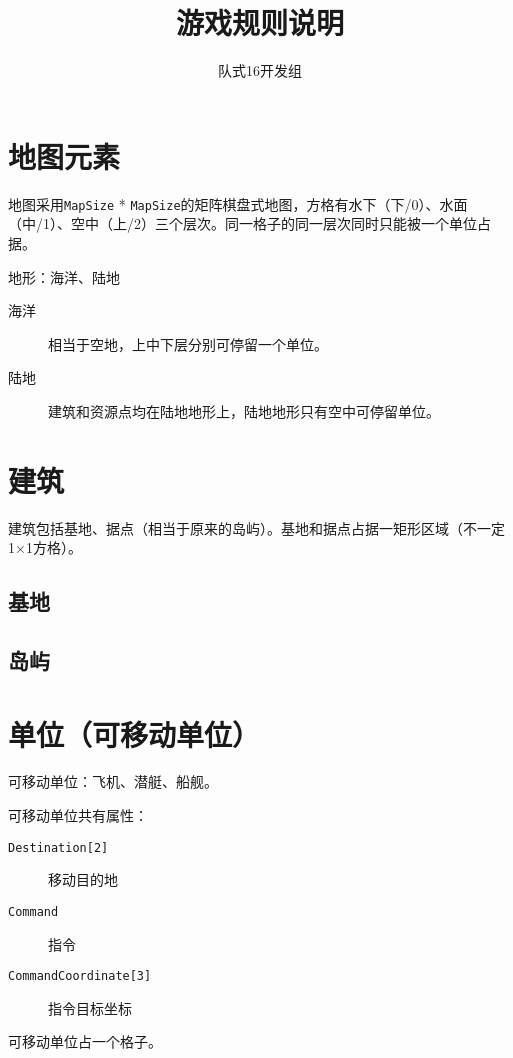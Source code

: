 \documentclass[11pt,a4paper]{article}
\title{游戏规则说明}
\author{队式16开发组}
\begin{document}
  \maketitle

  \section{地图元素}
    地图采用\texttt{MapSize} * \texttt{MapSize}的矩阵棋盘式地图，方格有水下（下/0）、水面（中/1）、空中（上/2）三个层次。同一格子的同一层次同时只能被一个单位占据。

    地形：海洋、陆地

    \begin{description}
      \item[海洋] 相当于空地，上中下层分别可停留一个单位。
      \item[陆地] 建筑和资源点均在陆地地形上，陆地地形只有空中可停留单位。
    \end{description}


  \section{建筑}
    建筑包括基地、据点（相当于原来的岛屿）。基地和据点占据一矩形区域（不一定1×1方格）。

    \subsection{基地}
    \subsection{岛屿}



  \section{单位（可移动单位）}
    可移动单位：飞机、潜艇、船舰。

    可移动单位共有属性：

    \begin{description}
      \item[\texttt{Destination[2]}] 移动目的地
      \item[\texttt{Command}] 指令
      \item[\texttt{CommandCoordinate[3]}] 指令目标坐标
    \end{description}

    可移动单位占一个格子。
\end{document}
